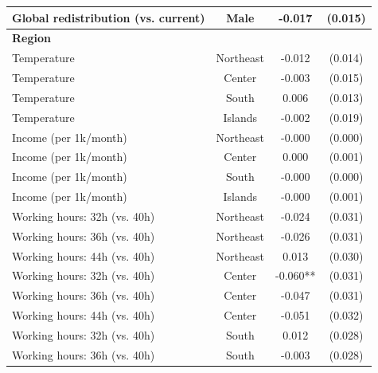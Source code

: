 \begin{table}[H]
\begin{tabular}{ l c c c }
\hspace{0.05cm} Global redistribution (vs. current) & Male & -0.017 & (0.015) \\
\hline
\multicolumn{4}{l}{\textbf{Region}} \\
\hspace{0.05cm} Temperature & Northeast & -0.012 & (0.014) \\
\hspace{0.05cm} Temperature & Center & -0.003 & (0.015) \\
\hspace{0.05cm} Temperature & South & 0.006 & (0.013) \\
\hspace{0.05cm} Temperature & Islands & -0.002 & (0.019) \\
\hspace{0.05cm} Income (per 1k/month) & Northeast & -0.000 & (0.000) \\
\hspace{0.05cm} Income (per 1k/month) & Center & 0.000 & (0.001) \\
\hspace{0.05cm} Income (per 1k/month) & South & -0.000 & (0.000) \\
\hspace{0.05cm} Income (per 1k/month) & Islands & -0.000 & (0.001) \\
\hspace{0.05cm} Working hours: 32h (vs. 40h) & Northeast & -0.024 & (0.031) \\
\hspace{0.05cm} Working hours: 36h (vs. 40h) & Northeast & -0.026 & (0.031) \\
\hspace{0.05cm} Working hours: 44h (vs. 40h) & Northeast & 0.013 & (0.030) \\
\hspace{0.05cm} Working hours: 32h (vs. 40h) & Center & -0.060** & (0.031) \\
\hspace{0.05cm} Working hours: 36h (vs. 40h) & Center & -0.047 & (0.031) \\
\hspace{0.05cm} Working hours: 44h (vs. 40h) & Center & -0.051 & (0.032) \\
\hspace{0.05cm} Working hours: 32h (vs. 40h) & South & 0.012 & (0.028) \\
\hspace{0.05cm} Working hours: 36h (vs. 40h) & South & -0.003 & (0.028) \\

\end{tabular}
\end{table}
